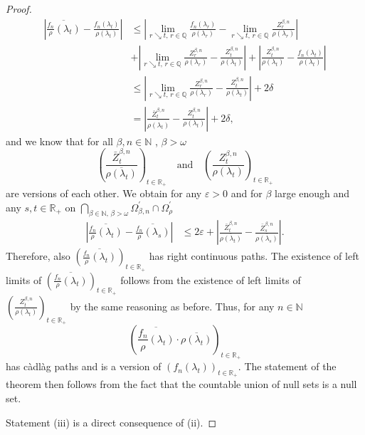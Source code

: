 \documentclass[a4paper,12pt]{article}
\theoremstyle{definition}
\theoremstyle{remark}
\numberwithin{equation}{section}
\numberwithin{theorem}{section}
\begin{document}
\begin{proof}
{\begin{align*}
\left|\overline{\frac{f_{n}}{\rho}(\lambda_{t})}-\frac{f_{n}(\lambda_{t})}{\rho(\lambda_{t})}\right| & \leq\left|\underset{r\searrow t,\,r\in\mathbb{Q}}{\lim}\frac{f_{n}(\lambda_{r})}{\rho(\lambda_{r})}-\underset{r\searrow t,\,r\in\mathbb{Q}}{\lim}\frac{Z_{r}^{\beta,n}}{\rho(\lambda_{r})}\right|\\
 & +\left|\underset{r\searrow t,\,r\in\mathbb{Q}}{\lim}\frac{Z_{r}^{\beta,n}}{\rho(\lambda_{r})}-\frac{Z_{t}^{\beta,n}}{\rho(\lambda_{t})}\right|+\left|\frac{Z_{t}^{\beta,n}}{\rho(\lambda_{t})}-\frac{f_{n}(\lambda_{t})}{\rho(\lambda_{t})}\right|\\
 & \leq\left|\underset{r\searrow t,\,r\in\mathbb{Q}}{\lim}\frac{Z_{r}^{\beta,n}}{\rho(\lambda_{r})}-\frac{Z_{t}^{\beta,n}}{\rho(\lambda_{t})}\right|+2\delta\\
 & =\left|\frac{\bar{Z}_{t}^{\beta,n}}{\overline{\rho(\lambda_{t})}}-\frac{Z_{t}^{\beta,n}}{\rho(\lambda_{t})}\right|+2\delta,
\end{align*}
}and we know that for all $\beta,n\in\mathbb{N}$ , $\beta>\omega$
\[
\left(\frac{\bar{Z}_{t}^{\beta,n}}{\overline{\rho(\lambda_{t})}}\right)_{t\in\mathbb{R}_{+}}
\quad \text{and} \quad 
\left(\frac{Z_{t}^{\beta,n}}{\rho(\lambda_{t})}\right)_{t\in\mathbb{R}_{+}}
\]
 are versions of each other. We obtain for any $\varepsilon>0$ and
for $\beta$ large enough and any $s,t\in\mathbb{R}_{+}$ on $\underset{\beta\in\mathbb{N},\,\beta>\omega}{\bigcap}\Omega_{\beta,n}^{'}\cap\Omega_{\rho}^{'}${\small{}
\begin{align*}
\left|\overline{\frac{f_{n}}{\rho}(\lambda_{t})}-\overline{\frac{f_{n}}{\rho}(\lambda_{s})}\right| & \leq2\varepsilon+\left|\frac{\bar{Z}_{t}^{\beta,n}}{\overline{\rho(\lambda_{t})}}-\frac{\bar{Z}_{s}^{\beta,n}}{\overline{\rho(\lambda_{s})}}\right|.
\end{align*}
}Therefore, also $\left(\overline{\frac{f_{n}}{\rho}(\lambda_{t})}\right)_{t\in\mathbb{\mathbb{R}}_{+}}$
has right continuous paths.  The existence of left limits of $\left(\overline{\frac{f_{n}}{\rho}(\lambda_{t})}\right)_{t\in\mathbb{\mathbb{R}}_{+}}$ follows from the existence of left limits of 
$
\left(\frac{Z_{t}^{\beta,n}}{\rho(\lambda_{t})}\right)_{t\in\mathbb{R}_{+}}
$
 by the same reasoning as before.
Thus, for any $n\in\mathbb{N}$
\[
\left(\overline{\frac{f_{n}}{\rho}(\lambda_{t})}\cdot\overline{\rho(\lambda_{t})}\right)_{t\in\mathbb{R}_{+}}
\]
has càdlàg paths and is a version of 
$
\left(f_{n}(\lambda_{t})\right)_{t\in\mathbb{R}_{+}}.
$
The statement of the theorem then follows from the fact that the countable
union of null sets is a null set. 

Statement (iii) is a direct consequence of (ii).
\end{proof}
\end{document}
